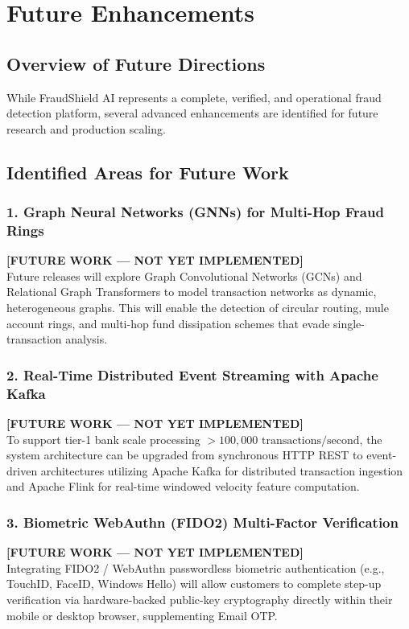 \chapter{Future Enhancements}
\label{chap:future_enhancements}

\section{Overview of Future Directions}
While FraudShield AI represents a complete, verified, and operational fraud detection platform, several advanced enhancements are identified for future research and production scaling.

\section{Identified Areas for Future Work}

\subsection{1. Graph Neural Networks (GNNs) for Multi-Hop Fraud Rings}
\textbf{[FUTURE WORK --- NOT YET IMPLEMENTED]}\\
Future releases will explore Graph Convolutional Networks (GCNs) and Relational Graph Transformers to model transaction networks as dynamic, heterogeneous graphs. This will enable the detection of circular routing, mule account rings, and multi-hop fund dissipation schemes that evade single-transaction analysis.

\subsection{2. Real-Time Distributed Event Streaming with Apache Kafka}
\textbf{[FUTURE WORK --- NOT YET IMPLEMENTED]}\\
To support tier-1 bank scale processing $> 100,000\text{ transactions/second}$, the system architecture can be upgraded from synchronous HTTP REST to event-driven architectures utilizing Apache Kafka for distributed transaction ingestion and Apache Flink for real-time windowed velocity feature computation.

\subsection{3. Biometric WebAuthn (FIDO2) Multi-Factor Verification}
\textbf{[FUTURE WORK --- NOT YET IMPLEMENTED]}\\
Integrating FIDO2 / WebAuthn passwordless biometric authentication (e.g., TouchID, FaceID, Windows Hello) will allow customers to complete step-up verification via hardware-backed public-key cryptography directly within their mobile or desktop browser, supplementing Email OTP.

